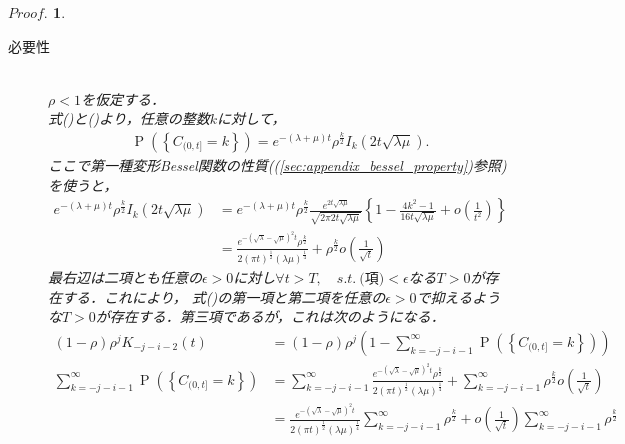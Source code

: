 \documentclass[a4j,papersize,disablejfam,slide,14pt]{jsarticle}
\newtheorem{Proof}{$Proof.$}
\def\exp#1{e^{#1}} %
\def\prob#1{\operatorname{P} \left(\left\{ #1 \right\}\right)} %
\begin{document}
    \begin{Proof}
    	\begin{description}
        	\item[必要性]\mbox{}\\
            	$\rho < 1$を仮定する．\\
            	式()と()より，任意の整数$k$に対して，
                \begin{align}
                	\prob{C_{(0, t]}=k} = \exp{-(\lambda+\mu)t}\rho^{\frac{k}{2}} I_k(2t\sqrt{\lambda\mu}).
                \end{align}
                ここで第一種変形{\rm Bessel}関数の性質((\ref{sec:appendix_bessel_property})参照)を使うと，
                \begin{align}
                	\exp{-(\lambda+\mu)t}\rho^{\frac{k}{2}} I_k(2t\sqrt{\lambda\mu}) 
                    &= \exp{-(\lambda+\mu)t}\rho^{\frac{k}{2}} \frac{ \exp{2t\sqrt{\lambda \mu}} }{ \sqrt{2 \pi 2t\sqrt{\lambda \mu}} }
                    	\left\{ 1-\frac{4k^2 - 1}{16t\sqrt{\lambda \mu}} + o\left( \frac{1}{t^2} \right) \right\} \\
                    &= \frac{ \exp{-(\sqrt{\lambda}-\sqrt{\mu})^2 t} \rho^\frac{k}{2} }{ 2(\pi t)^\frac{1}{2} (\lambda \mu)^\frac{1}{4} } + \rho^{\frac{k}{2}} o\left( \frac{1}{\sqrt{t}} \right) \label{eq:prob_c_deform}
                \end{align}
                最右辺は二項とも任意の$\epsilon > 0$に対し$\forall t > T,\quad s.t.\ \mbox{(項)} < \epsilon$なる$T > 0$が存在する．これにより，
                式()の第一項と第二項を任意の$\epsilon > 0$で抑えるような$T > 0$が存在する．第三項であるが，これは次のようになる．
                \begin{align}
                	(1-\rho)\rho^j K_{-j-i-2}(t) &= (1-\rho)\rho^j \left(1 - \sum_{k=-j-i-1}^{\infty} \prob{C_{(0, t]}=k} \right) \\
                    \sum_{k=-j-i-1}^{\infty} \prob{C_{(0, t]}=k} 
                    &= \sum_{k=-j-i-1}^{\infty} \frac{ \exp{-(\sqrt{\lambda}-\sqrt{\mu})^2 t} \rho^\frac{k}{2} }{ 2(\pi t)^\frac{1}{2} (\lambda \mu)^\frac{1}{4} } 
                    	+ \sum_{k=-j-i-1}^{\infty} \rho^{\frac{k}{2}} o\left( \frac{1}{\sqrt{t}} \right) \\
                    &= \frac{ \exp{-(\sqrt{\lambda}-\sqrt{\mu})^2 t} }{ 2(\pi t)^\frac{1}{2} (\lambda \mu)^\frac{1}{4} } \sum_{k=-j-i-1}^{\infty}  \rho^\frac{k}{2} 
                    	+ o\left( \frac{1}{\sqrt{t}} \right) \sum_{k=-j-i-1}^{\infty} \rho^{\frac{k}{2}} \\

\end{align}
\end{description}
\end{Proof}
\end{document}
